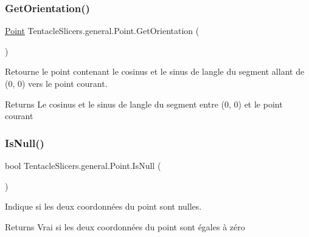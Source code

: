 \subsubsection{\texorpdfstring{Get\+Orientation()}{GetOrientation()}\hspace{0.1cm}{\footnotesize\ttfamily [2/2]}}
{\footnotesize\ttfamily \hyperlink{class_tentacle_slicers_1_1general_1_1_point}{Point} Tentacle\+Slicers.\+general.\+Point.\+Get\+Orientation (\begin{DoxyParamCaption}{ }\end{DoxyParamCaption})}



Retourne le point contenant le cosinus et le sinus de l\textquotesingle{}angle du segment allant de (0, 0) vers le point courant. 

\begin{DoxyReturn}{Returns}
Le cosinus et le sinus de l\textquotesingle{}angle du segment entre (0, 0) et le point courant 
\end{DoxyReturn}
\mbox{\label{class_tentacle_slicers_1_1general_1_1_point_a046c50bd6fdaf4f289ee8157851a2011}} 
\subsubsection{\texorpdfstring{Is\+Null()}{IsNull()}}
{\footnotesize\ttfamily bool Tentacle\+Slicers.\+general.\+Point.\+Is\+Null (\begin{DoxyParamCaption}{ }\end{DoxyParamCaption})}



Indique si les deux coordonnées du point sont nulles. 

\begin{DoxyReturn}{Returns}
Vrai si les deux coordonnées du point sont égales à zéro 
\end{DoxyReturn}
\mbox{\label{class_tentacle_slicers_1_1general_1_1_point_a78f6727f6e2594e6fd05858ef0fabb7a}} 

